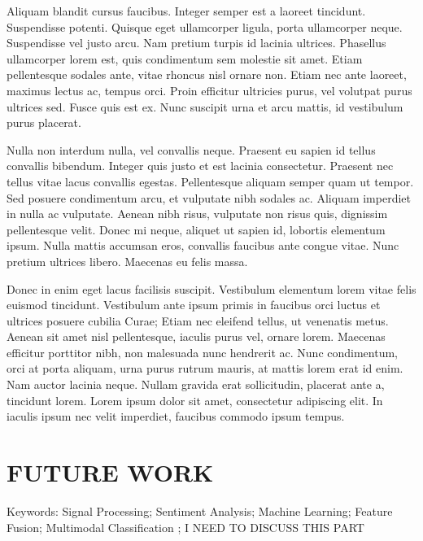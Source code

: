 Aliquam blandit cursus faucibus. Integer semper est a laoreet tincidunt. Suspendisse potenti. Quisque eget ullamcorper ligula, porta ullamcorper neque. Suspendisse vel justo arcu. Nam pretium turpis id lacinia ultrices. Phasellus ullamcorper lorem est, quis condimentum sem molestie sit amet. Etiam pellentesque sodales ante, vitae rhoncus nisl ornare non. Etiam nec ante laoreet, maximus lectus ac, tempus orci. Proin efficitur ultricies purus, vel volutpat purus ultrices sed. Fusce quis est ex. Nunc suscipit urna et arcu mattis, id vestibulum purus placerat.

Nulla non interdum nulla, vel convallis neque. Praesent eu sapien id tellus convallis bibendum. Integer quis justo et est lacinia consectetur. Praesent nec tellus vitae lacus convallis egestas. Pellentesque aliquam semper quam ut tempor. Sed posuere condimentum arcu, et vulputate nibh sodales ac. Aliquam imperdiet in nulla ac vulputate. Aenean nibh risus, vulputate non risus quis, dignissim pellentesque velit. Donec mi neque, aliquet ut sapien id, lobortis elementum ipsum. Nulla mattis accumsan eros, convallis faucibus ante congue vitae. Nunc pretium ultrices libero. Maecenas eu felis massa.

Donec in enim eget lacus facilisis suscipit. Vestibulum elementum lorem vitae felis euismod tincidunt. Vestibulum ante ipsum primis in faucibus orci luctus et ultrices posuere cubilia Curae; Etiam nec eleifend tellus, ut venenatis metus. Aenean sit amet nisl pellentesque, iaculis purus vel, ornare lorem. Maecenas efficitur porttitor nibh, non malesuada nunc hendrerit ac. Nunc condimentum, orci at porta aliquam, urna purus rutrum mauris, at mattis lorem erat id enim. Nam auctor lacinia neque. Nullam gravida erat sollicitudin, placerat ante a, tincidunt lorem. Lorem ipsum dolor sit amet, consectetur adipiscing elit. In iaculis ipsum nec velit imperdiet, faucibus commodo ipsum tempus.




\chapter{FUTURE WORK}
Keywords: Signal Processing; Sentiment Analysis; Machine Learning; 
Feature Fusion; Multimodal Classification ; I NEED TO DISCUSS THIS PART